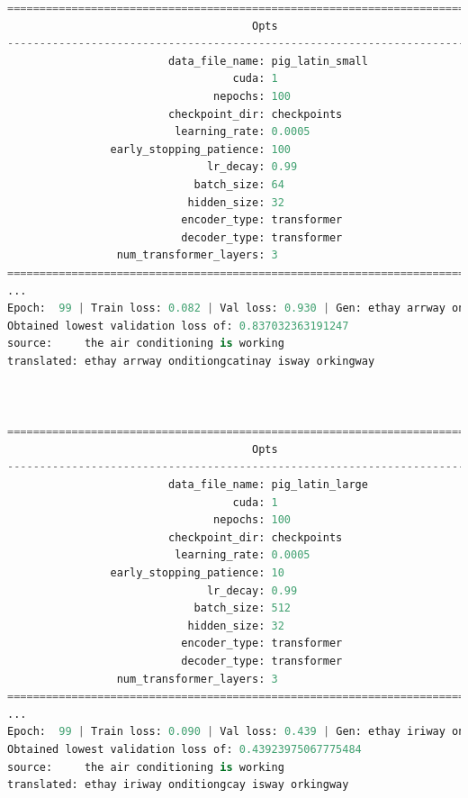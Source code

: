 \documentclass{article}
\begin{document}
\begin{lstlisting}[language=Python]
================================================================================
                                      Opts                                      
--------------------------------------------------------------------------------
                         data_file_name: pig_latin_small                        
                                   cuda: 1                                      
                                nepochs: 100                                    
                         checkpoint_dir: checkpoints                            
                          learning_rate: 0.0005                                 
                early_stopping_patience: 100                                    
                               lr_decay: 0.99                                   
                             batch_size: 64                                     
                            hidden_size: 32                                     
                           encoder_type: transformer                            
                           decoder_type: transformer                            
                 num_transformer_layers: 3                                      
================================================================================
...
Epoch:  99 | Train loss: 0.082 | Val loss: 0.930 | Gen: ethay arrway onditiongcatinay isway orkingway
Obtained lowest validation loss of: 0.837032363191247
source:		the air conditioning is working 
translated:	ethay arrway onditiongcatinay isway orkingway



================================================================================
                                      Opts                                      
--------------------------------------------------------------------------------
                         data_file_name: pig_latin_large                        
                                   cuda: 1                                      
                                nepochs: 100                                    
                         checkpoint_dir: checkpoints                            
                          learning_rate: 0.0005                                 
                early_stopping_patience: 10                                     
                               lr_decay: 0.99                                   
                             batch_size: 512                                    
                            hidden_size: 32                                     
                           encoder_type: transformer                            
                           decoder_type: transformer                            
                 num_transformer_layers: 3                                      
================================================================================
...
Epoch:  99 | Train loss: 0.090 | Val loss: 0.439 | Gen: ethay iriway onditiongcay isway orkingway
Obtained lowest validation loss of: 0.43923975067775484
source:		the air conditioning is working 
translated:	ethay iriway onditiongcay isway orkingway



\end{lstlisting}
\end{document}
